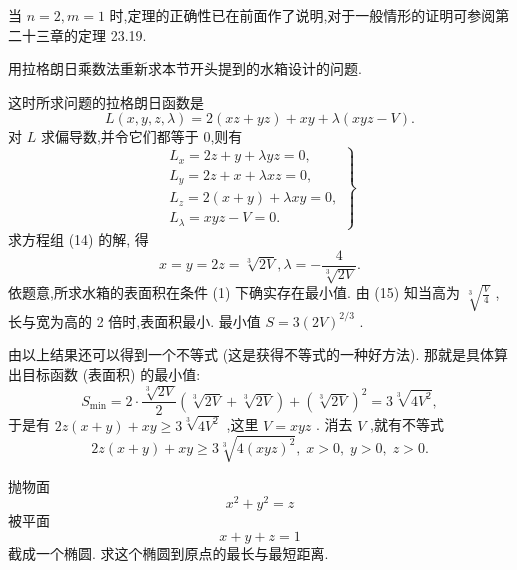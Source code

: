 当 \(n = 2,m = 1\) 时,定理的正确性已在前面作了说明,对于一般情形的证明可参阅第二十三章的定理 23.19.

\begin{example}

\end{example}
用拉格朗日乘数法重新求本节开头提到的水箱设计的问题.

\begin{solution}

\end{solution}
这时所求问题的拉格朗日函数是
\[
L\left( {x,y,z,\lambda }\right)  = 2\left( {{xz} + {yz}}\right)  + {xy} + \lambda \left( {{xyz} - V}\right) .
\]
对 \(L\) 求偏导数,并令它们都等于 0,则有
\[
\left. \begin{array}{l} {L}_{x} = {2z} + y + {\lambda yz} = 0, \\  {L}_{y} = {2z} + x + {\lambda xz} = 0, \\  {L}_{z} = 2\left( {x + y}\right)  + {\lambda xy} = 0, \\  {L}_{\lambda } = {xyz} - V = 0. \end{array}\right\}   \tag{14}
\]
求方程组 (14) 的解, 得
\[
x = y = {2z} = \sqrt[3]{2V},\lambda  =  - \frac{4}{\sqrt[3]{2V}}. \tag{15}
\]
依题意,所求水箱的表面积在条件 (1) 下确实存在最小值. 由 (15) 知当高为 \(\sqrt[3]{\frac{V}{4}}\) ,长与宽为高的 2 倍时,表面积最小. 最小值 \(S = 3{\left( 2V\right) }^{2/3}\) .

\begin{remark}

\end{remark}
由以上结果还可以得到一个不等式 (这是获得不等式的一种好方法). 那就是具体算出目标函数 (表面积) 的最小值:
\[
{S}_{\min } = 2 \cdot  \frac{\sqrt[3]{2V}}{2}\left( {\sqrt[3]{2V} + \sqrt[3]{2V}}\right)  + {\left( \sqrt[3]{2V}\right) }^{2} = 3\sqrt[3]{4{V}^{2}},
\]
于是有 \({2z}\left( {x + y}\right)  + {xy} \geq  3\sqrt[3]{4{V}^{2}}\) ,这里 \(V = {xyz}\) . 消去 \(V\) ,就有不等式
\[
{2z}\left( {x + y}\right)  + {xy} \geq  3\sqrt[3]{4{\left( xyz\right) }^{2}},\;x > 0,\;y > 0,\;z > 0.
\]
\begin{example}

\end{example}
抛物面
\[
{x}^{2} + {y}^{2} = z
\]
被平面
\[
x + y + z = 1
\]
截成一个椭圆. 求这个椭圆到原点的最长与最短距离.

